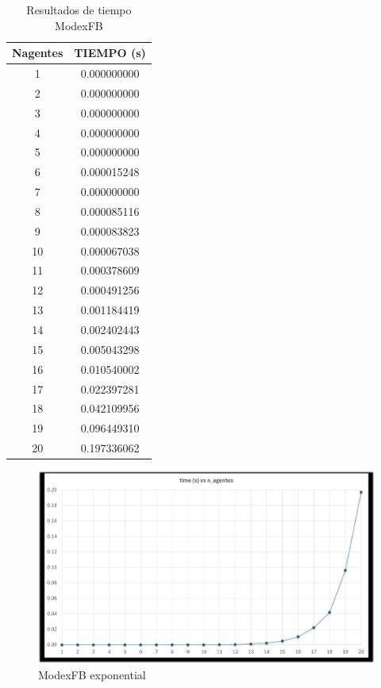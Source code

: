 \documentclass[letterpaper,10pt]{article}
\begin{document}
\begin{table}[H]
  \centering
  \begin{tabular}{|c|c|}
      \hline
      \textbf{Nagentes} & \textbf{TIEMPO (s)} \\
      \hline
      1  & 0.000000000 \\
      2  & 0.000000000 \\
      3  & 0.000000000 \\
      4  & 0.000000000 \\
      5  & 0.000000000 \\
      6  & 0.000015248 \\
      7  & 0.000000000 \\
      8  & 0.000085116 \\
      9  & 0.000083823 \\
      10 & 0.000067038 \\
      11 & 0.000378609 \\
      12 & 0.000491256 \\
      13 & 0.001184419 \\
      14 & 0.002402443 \\
      15 & 0.005043298 \\
      16 & 0.010540002 \\
      17 & 0.022397281 \\
      18 & 0.042109956 \\
      19 & 0.096449310 \\
      20 & 0.197336062 \\
      \hline
  \end{tabular}
  \caption{Resultados de tiempo ModexFB}
\end{table}  

\begin{figure}[H]
  \centering
  \begin{minipage}{1\textwidth}
    \centering
    \includegraphics[width=\textwidth]{Images/modexfb1.png}
  \end{minipage}
  \caption{ModexFB exponential} 
  \label{fig:modexfbcomplexity}
\end{figure}
\end{document}
